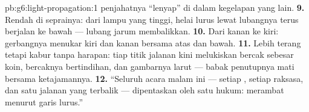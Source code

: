 \begin{solution}{pb:g6:light-propagation:1}
penjahatnya ``lenyap'' di dalam kegelapan yang lain.
\textbf{9.} Rendah di seprainya: dari lampu yang tinggi, helai lurus
lewat lubangnya terus berjalan ke bawah --- lubang jarum membalikkan.
\textbf{10.} Dari kanan ke kiri: gerbangnya menukar kiri dan kanan
bersama atas dan bawah.
\textbf{11.} Lebih terang tetapi kabur tanpa harapan: tiap titik
jalanan kini melukiskan bercak sebesar koin, bercaknya bertindihan,
dan gambarnya larut --- babak penutupnya mati bersama ketajamannya.
\textbf{12.} ``Seluruh acara malam ini --- setiap ,
setiap raksasa, dan satu jalanan yang terbalik --- dipentaskan oleh
satu hukum:  merambat menurut garis lurus.''
\end{solution}
